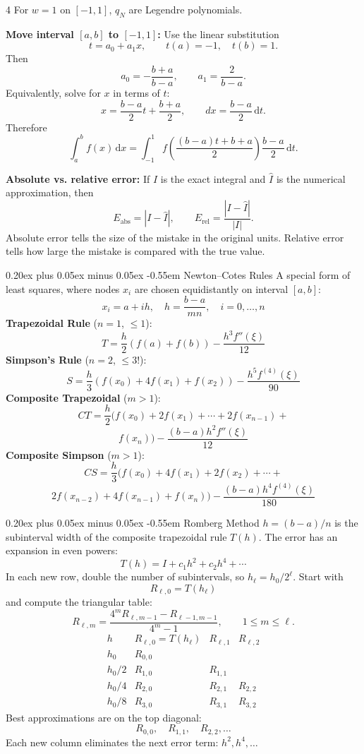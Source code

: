 \documentclass[10pt,a4paper]{article}
\makeatletter
\newcommand{\sheetfontsize}{\fontsize{7.5pt}{8.4pt}\selectfont}
\renewcommand\subsection{\@startsection{subsection}{2}{\z@}%
  {0.20ex plus 0.05ex minus 0.05ex}%
  {-0.55em}%
  {\normalfont\sheetfontsize\bfseries}}
\newcommand{\dd}{\,\mathrm{d}}
\makeatother
\begin{document}
\begin{multicols*}{4}
For $w=1$ on $[-1,1]$, $q_N$ are Legendre polynomials.

\textbf{Move interval $[a,b]$ to $[-1,1]$:}
Use the linear substitution
\[
  t=a_0+a_1x,\qquad t(a)=-1,\quad t(b)=1.
\]
Then
\[
  a_0=-\frac{b+a}{b-a},\qquad a_1=\frac{2}{b-a}.
\]
Equivalently, solve for $x$ in terms of $t$:
\[
  x=\frac{b-a}{2}t+\frac{b+a}{2},
  \qquad
  dx=\frac{b-a}{2}\dd t.
\]
Therefore
\[
  \int_a^b f(x)\dd x
  =
  \int_{-1}^1
  f\left(\frac{(b-a)t+b+a}{2}\right)
  \frac{b-a}{2}\dd t.
\]

\textbf{Absolute vs. relative error:}
If $I$ is the exact integral and $\hat I$ is the numerical approximation, then
\[
  E_{\mathrm{abs}}=|I-\hat I|,
  \qquad
  E_{\mathrm{rel}}=\frac{|I-\hat I|}{|I|}.
\]
Absolute error tells the size of the mistake in the original units. Relative
error tells how large the mistake is compared with the true value.

\subsection{Newton--Cotes Rules}
A special form of least squares, where nodes $x_i$ are chosen
equidistantly on interval $[a,b]$:
\[
  x_i=a+ih, \quad h=\frac{b-a}{mn}, \quad i=0,\ldots,n
\]
\textbf{Trapezoidal Rule} ($n=1$, $\leq 1$):
\[
T  =\frac{h}{2}(f(a)+f(b))-\frac{h^3 f''(\xi)}{12}
\]
\textbf{Simpson's Rule} ($n=2$, $\leq 3!$):
\[
S  =\frac{h}{3}(f(x_0)+4f(x_1)+f(x_2))-\frac{h^5 f^{(4)}(\xi)}{90}
\]
\textbf{Composite Trapezoidal} ($m>1$):
\[
CT  =\frac{h}{2}(f(x_0)+2f(x_1)+\cdots+2f(x_{n-1})+
\]
\[
  f(x_n))-\frac{(b-a)h^2f''(\xi)}{12}
\]
\textbf{Composite Simpson} ($m>1$):
\[
CS  =\frac{h}{3}(f(x_0)+4f(x_1)+2f(x_2)+\cdots+
\]
\[
  2f(x_{n-2})+4f(x_{n-1})+f(x_n))-
  \frac{(b-a)h^4f^{(4)}(\xi)}{180}
\]

\subsection{Romberg Method}
$h=(b-a)/n$ is the subinterval width of the composite trapezoidal rule $T(h)$.
The error has an expansion in even powers:
\[
  T(h)=I+c_1h^2+c_2h^4+\cdots
\]
In each new row, double the number of subintervals, so
$h_\ell=h_0/2^\ell$. Start with
\[
  R_{\ell,0}=T(h_\ell)
\]
and compute the triangular table:
\[
  R_{\ell,m}=
  \frac{4^mR_{\ell,m-1}-R_{\ell-1,m-1}}{4^m-1},
  \qquad 1\leq m\leq\ell.
\]
\[
\begin{array}{c|c|c|c}
  h & R_{\ell,0}=T(h_\ell) & R_{\ell,1} & R_{\ell,2} \\ \hline
  h_0     & R_{0,0} & & \\
  h_0/2   & R_{1,0} & R_{1,1} & \\
  h_0/4   & R_{2,0} & R_{2,1} & R_{2,2} \\
  h_0/8   & R_{3,0} & R_{3,1} & R_{3,2}
\end{array}
\]
Best approximations are on the top diagonal:
\[
  R_{0,0},\quad R_{1,1},\quad R_{2,2},\ldots
\]
Each new column eliminates the next error term: $h^2,h^4,\ldots$



\end{multicols*}
\end{document}
